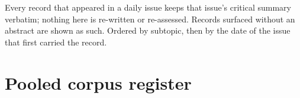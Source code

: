 \documentclass[10pt]{article}
\begin{document}
{\fontsize{7.4}{9}\selectfont\color{Slate}Every record that appeared in a daily issue
keeps that issue's critical summary verbatim; nothing here is re-written or re-assessed.
Records surfaced without an abstract are shown as such. Ordered by subtopic, then by the
date of the issue that first carried the record.\par}



\clearpage

\section*{\sffamily\bfseries\color{Deep}Pooled corpus register}
\vspace{-1.5mm}{\color{Teal}\rule{\linewidth}{1.1pt}}\vspace{2.5mm}


\end{document}
